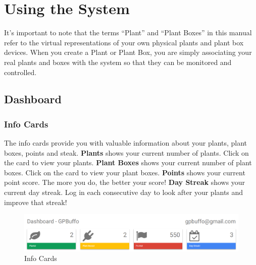 \documentclass{article}
\begin{document}
\cleardoublepage

\section{Using the System}
	It's important to note that the terms ``Plant'' and ``Plant Boxes'' in this manual refer to the virtual representations of your own physical plants and plant box devices. When you create a Plant or Plant Box, you are simply associating your real plants and boxes with the system so that they can be monitored and controlled. 
	
	\subsection{Dashboard}
	\subsubsection{Info Cards}
	The info cards provide you with valuable information about your plants, plant boxes, points and steak.
	\newline\newline
	\textbf{Plants} shows your current number of plants. Click on the card to view your plants.
	\newline
	\textbf{Plant Boxes} shows your current number of plant boxes. Click on the card to view your plant boxes.
	\newline
	\textbf{Points} shows your current point score. The more you do, the better your score!
	\newline
	\textbf{Day Streak} shows your current day streak. Log in each consecutive day to look after your plants and improve that streak!
	\begin{figure}[H]
		\includegraphics[width=\textwidth]{../images/UserManual/info-cards.png}
		\caption{Info Cards}
	\end{figure}
	
\end{document}
